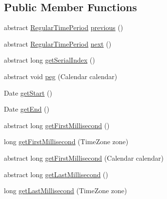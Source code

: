 \subsection*{Public Member Functions}
\begin{DoxyCompactItemize}
\item 
abstract \mbox{\hyperlink{classorg_1_1jfree_1_1data_1_1time_1_1_regular_time_period}{Regular\+Time\+Period}} \mbox{\hyperlink{classorg_1_1jfree_1_1data_1_1time_1_1_regular_time_period_a1726057d88322b2f9eebf9d4ec46efab}{previous}} ()
\item 
abstract \mbox{\hyperlink{classorg_1_1jfree_1_1data_1_1time_1_1_regular_time_period}{Regular\+Time\+Period}} \mbox{\hyperlink{classorg_1_1jfree_1_1data_1_1time_1_1_regular_time_period_a1699523baa1cc5e9a39261a6415c1d28}{next}} ()
\item 
abstract long \mbox{\hyperlink{classorg_1_1jfree_1_1data_1_1time_1_1_regular_time_period_abe01895fe40608e97cc2ac2c97e8ca57}{get\+Serial\+Index}} ()
\item 
abstract void \mbox{\hyperlink{classorg_1_1jfree_1_1data_1_1time_1_1_regular_time_period_ae3251d790d4e91328a451b741bfa1e37}{peg}} (Calendar calendar)
\item 
Date \mbox{\hyperlink{classorg_1_1jfree_1_1data_1_1time_1_1_regular_time_period_aaa6e30c0526db40f5a63b5a9e4cf7d34}{get\+Start}} ()
\item 
Date \mbox{\hyperlink{classorg_1_1jfree_1_1data_1_1time_1_1_regular_time_period_a90dca860a17fffbbacbe0d2ddeb721fe}{get\+End}} ()
\item 
abstract long \mbox{\hyperlink{classorg_1_1jfree_1_1data_1_1time_1_1_regular_time_period_a7aa230d10a6d78c81db0b74dce832526}{get\+First\+Millisecond}} ()
\item 
long \mbox{\hyperlink{classorg_1_1jfree_1_1data_1_1time_1_1_regular_time_period_a2e46e03754784f461b73ceb910a36afa}{get\+First\+Millisecond}} (Time\+Zone zone)
\item 
abstract long \mbox{\hyperlink{classorg_1_1jfree_1_1data_1_1time_1_1_regular_time_period_a673bf019570d5e38eea9787c8e0ce42a}{get\+First\+Millisecond}} (Calendar calendar)
\item 
abstract long \mbox{\hyperlink{classorg_1_1jfree_1_1data_1_1time_1_1_regular_time_period_ab5ad818ae1c90ec6efd57304594e6801}{get\+Last\+Millisecond}} ()
\item 
long \mbox{\hyperlink{classorg_1_1jfree_1_1data_1_1time_1_1_regular_time_period_aaeb1a139a8046725c6827b0db023efd8}{get\+Last\+Millisecond}} (Time\+Zone zone)
\item 

\end{DoxyCompactItemize}
